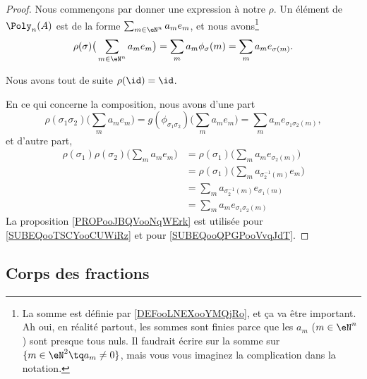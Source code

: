 \begin{proof}
    Nous commençons par donner une expression à notre \( \rho\). Un élément de \( \Poly_n(A)\) est de la forme \( \sum_{m\in \eN^n}a_me_m\), et nous avons\footnote{La somme est définie par \ref{DEFooLNEXooYMQjRo}, et ça va être important. Ah oui, en réalité partout, les sommes sont finies parce que les \( a_m\) (\( m\in \eN^n\)) sont presque tous nuls. Il faudrait écrire sur la somme sur \(\{ m\in \eN^2\tq a_m\neq 0 \}\), mais vous vous imaginez la complication dans la notation.}
    \begin{equation}
        \rho(\sigma)\big( \sum_{m\in \eN^n}a_me_m \big)=\sum_ma_m\phi_{\sigma}(m)=\sum_ma_me_{\sigma(m)}.
    \end{equation}
    
    Nous avons tout de suite \( \rho(\id)=\id\).

    En ce qui concerne la composition, nous avons d'une part
    \begin{equation}
        \rho(\sigma_1\sigma_2)\big( \sum_ma_me_m \big)=g(\phi_{\sigma_1\sigma_2})\big( \sum_ma_me_m \big)=\sum_ma_me_{\sigma_1\sigma_2(m)},
    \end{equation}
    et d'autre part,
    \begin{subequations}
        \begin{align}
            \rho(\sigma_1)\rho(\sigma_2)\big( \sum_ma_me_m \big)&=\rho(\sigma_1)\big( \sum_ma_me_{\sigma_2(m)} \big)\\
            &=\rho(\sigma_1)\big( \sum_ma_{\sigma_2^{-1}(m)}e_m \big)   \label{SUBEQooTSCYooCUWiRz}\\
            &=\sum_ma_{\sigma_2^{-1}(m)}e_{\sigma_1(m)}\\
            &=\sum_ma_me_{\sigma_1\sigma_2(m)}      \label{SUBEQooQPGPooVvqJdT}
        \end{align}
    \end{subequations}
    La proposition \ref{PROPooJBQVooNqWErk} est utilisée pour \eqref{SUBEQooTSCYooCUWiRz} et pour \eqref{SUBEQooQPGPooVvqJdT}.
\end{proof}


\subsection{Corps des fractions}

